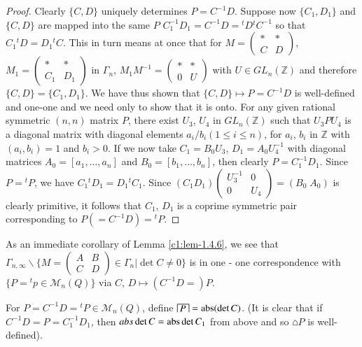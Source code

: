 \begin{proof}
Clearly $\{C,D\}$ uniquely determines $P=C^{-1}D$. Suppose now
$\{C_{1},D_{1}\}$ and $\{C,D\}$ are mapped into the same $P$ \ie
$C^{-1}_{1}D_{1}=C^{-1}D={}^{t}D{}^{t}C^{-1}$ so that
$C_{1}{}^{t}D=D_{1}{}^{t}C$. This in turn means at once that for
$M=\left(\begin{smallmatrix} \ast & \ast\\ C & D
\end{smallmatrix}\right)$, $M_{1}=\left(\begin{smallmatrix} \ast &
  \ast\\ C_{1} & D_{1}\end{smallmatrix}\right)$ in $\Gamma_{n}$,
$M_{1}M^{-1}=\left(\begin{smallmatrix} \ast & \ast\\ 0 & U
\end{smallmatrix}\right)$ with $U\in GL_{n}(\mathbb{Z})$ and therefore
$\{C,D\}=\{C_{1},D_{1}\}$. We have thus shown that $\{C,D\}\mapsto
P=C^{-1}D$ is well-defined and one-one and we need only to show that
it is onto. For any given rational symmetric $(n,n)$ matrix $P$, there
exist $U_{3}$, $U_{4}$ in $GL_{n}(\mathbb{Z})$ such that $U_{3}PU_{4}$
is a diagonal matrix with diagonal elements $a_{i}/b_{i}(1\leq i\leq
n)$, for $a_{i}$, $b_{i}$ in $\mathbb{Z}$ with $(a_{i},b_{i})=1$ and
$b_{i}>0$. If we now take $C_{1}=B_{0}U_{3}$, $D_{1}=A_{0}U^{-1}_{4}$
with diagonal matrices $A_{0}=[a_{1},\ldots,a_{n}]$ and
$B_{0}=[b_{1},\ldots,b_{n}]$, then clearly $P=C^{-1}_{1}D_{1}$. Since
$P={}^{t}P$, we have $C_{1}{}^{t}D_{1}=D_{1}{}^{t}C_{1}$. Since
$(C_{1}D_{1})\left(\begin{smallmatrix} U^{-1}_{3} & 0\\ 0 & U_{4}
\end{smallmatrix}\right)=(B_{0} \; A_{0})$ is clearly primitive, it
follows that $C_{1}$, $D_{1}$ is a coprime symmetric pair
corresponding to $P(=C^{-1}D)={}^{t}P$.
\end{proof}

As an immediate corollary of Lemma \ref{c1:lem-1.4.6}, we see that
$\Gamma_{n,\infty}\backslash \{M=\left(\begin{smallmatrix} A & B\\ C &
  D
\end{smallmatrix}\right)\in \Gamma_{n}|\det C\neq 0\}$ is in one - one
correspondence with $\{P={}^{t}p\in \mathscr{M}_{n}(Q)\}$ via $C$,
$D\mapsto (C^{-1}D=)P$.

\begin{defi*}
For $P=C^{-1}D={}^{t}P\in \mathscr{M}_{n}(Q)$, define
$\house{P}=\abs(\det C)$. (It is clear that if
$C^{-1}D=P=C^{-1}_{1}D_{1}$, then $abs\det C=\operatorname{abs}\det C_{1}$ from
above and so $\house{P}$ is well-defined).
\end{defi*}


